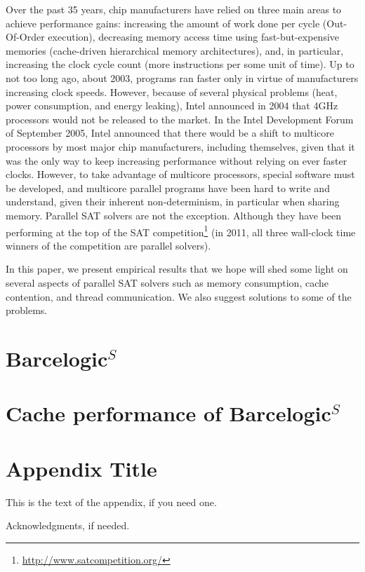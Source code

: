 \documentclass{llncs}
\begin{document}
Over the past 35 years, chip manufacturers have relied on three main
areas to achieve performance gains: increasing the amount of work done
per cycle (Out-Of-Order execution), decreasing memory access time
using fast-but-expensive memories (cache-driven hierarchical memory
architectures), and, in particular, increasing the clock cycle count
(more instructions per some unit of time). Up to not too long ago,
about 2003, programs ran faster only in virtue of manufacturers
increasing clock speeds. However, because of several physical problems
(heat, power consumption, and energy leaking), Intel announced in 2004
that 4GHz processors would not be released to the market.  In the
Intel Development Forum of September 2005, Intel announced that there
would be a shift to multicore processors by most major chip
manufacturers, including themselves, given that it was the only way to
keep increasing performance without relying on ever faster
clocks. However, to take advantage of multicore processors, special
software must be developed, and multicore parallel programs have been
hard to write and understand, given their inherent non-determinism, in
particular when sharing memory. Parallel SAT solvers are not the
exception. Although they have been performing at the top of the SAT
competition\footnote{\url{http://www.satcompetition.org/}} (in 2011,
all three wall-clock time winners of the competition are parallel
solvers).

In this paper, we present empirical results that we hope will shed
some light on several aspects of parallel SAT solvers such as memory
consumption, cache contention, and thread communication. We also
suggest solutions to some of the problems.

\section{Barcelogic$^S$}
\label{sec:barsimple}

\section{Cache performance of Barcelogic$^S$}
\label{sec:cachebar}



\appendix
\section{Appendix Title}

This is the text of the appendix, if you need one.

Acknowledgments, if needed.




\end{document}
